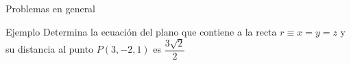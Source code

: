 \documentclass[8pt]{beamer}
\begin{document}
\begin{frame}{Problemas en general}
\begin{exampleblock}{Ejemplo}
Determina la ecuación del plano que contiene a la recta $r \equiv x=y=z$ y su distancia al punto $P(3,-2,1)$ es $\dfrac{3\sqrt{2}}{2}$
\end{exampleblock}

\end{frame}
\end{document}
